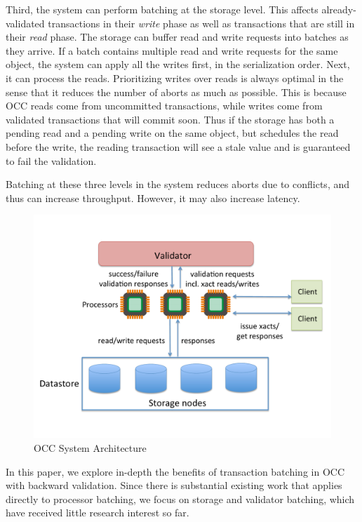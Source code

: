 Third, the system can perform batching at the storage level. This affects already-validated transactions in their \emph{write} phase as well as transactions that are still in their \emph{read} phase. The storage can buffer read and write requests into batches as they arrive. If a batch contains multiple read and write requests for the same object, the system can apply all the writes first, in the serialization order. Next, it can process the reads. Prioritizing writes over reads is always optimal in the sense that it reduces the number of aborts as much as possible. This is because OCC reads come from uncommitted transactions, while writes come from validated transactions that will commit soon. Thus if the storage has both a pending read and a pending write on the same object, but schedules the read before the write, the reading transaction will see a stale value and is guaranteed to fail the validation. 

Batching at these three levels in the system reduces aborts due to conflicts, and thus can increase throughput. However, it may also increase latency.

\begin{figure}[t]
 \centering
 \includegraphics[width=0.7\columnwidth]{figures/OCCArchitecture.pdf}
 \vspace{-.5em}
 \caption{OCC System Architecture}
 \vspace{-1.5em}
 \label{fig:occ_arch}
\end{figure}


In this paper, we explore in-depth the benefits of transaction batching in OCC with backward validation. Since there is substantial existing work that applies directly to processor batching, we focus on storage and validator batching, which have received little research interest so far.

